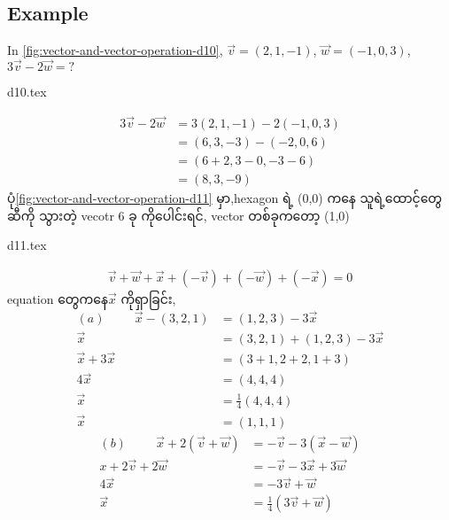 \subsection{Example}
In \ref{fig:vector-and-vector-operation-d10}, $\vec{v}=(2,1,-1)$, $\vec{w}=(-1,0,3)$, $3\vec{v}-2\vec{w}=?$
\begin{center}
    {d10.tex}
\end{center}
\[
    \begin{split}
        3\vec{v}-2\vec{w} & =3(2,1,-1)-2(-1,0,3) \\
                          & = (6,3,-3)-(-2,0,6)  \\
                          & = (6+2,3-0,-3-6)     \\
                          & = (8,3,-9)
    \end{split}
\]
ပုံ\ref{fig:vector-and-vector-operation-d11} မှာ,hexagon ရဲ့ (0,0) ကနေ သူရဲ့ထောင့်တွေဆီကို သွားတဲ့ vecotr 6 ခု ကိုပေါင်းရင်, vector တစ်ခုကတော့ (1,0)
\begin{center}
    {d11.tex}
\end{center}
\[
    \begin{split}
        \vec{v}+\vec{w}+\vec{x}+(-\vec{v})+(-\vec{w})+(-\vec{x})=0
    \end{split}
\]
equation တွေကနေ$\vec{x}$ ကိုရှာခြင်း,
\[
    \begin{split}
        (a)\hspace{1cm}\vec{x}-(3,2,1) & =(1,2,3)-3\vec{x}         \\
        \vec{x}                        & =(3,2,1)+(1,2,3)-3\vec{x} \\
        \vec{x}+3\vec{x}               & =(3+1,2+2,1+3)            \\
        4\vec{x}                       & =(4,4,4)                  \\
        \vec{x}                        & =\frac{1}{4}(4,4,4)       \\
        \vec{x}                        & =(1,1,1)
    \end{split}
\]
\[
    \begin{split}
        (b)\hspace{1cm}\vec{x}+2(\vec{v}+\vec{w}) & =-\vec{v}-3(\vec{x}-\vec{w})   \\
        x+2\vec{v}+2\vec{w}                       & =-\vec{v}-3\vec{x}+3\vec{w}    \\
        4\vec{x}                                  & =-3\vec{v}+\vec{w}             \\
        \vec{x}                                   & =\frac{1}{4}(3\vec{v}+\vec{w})
    \end{split}
\]